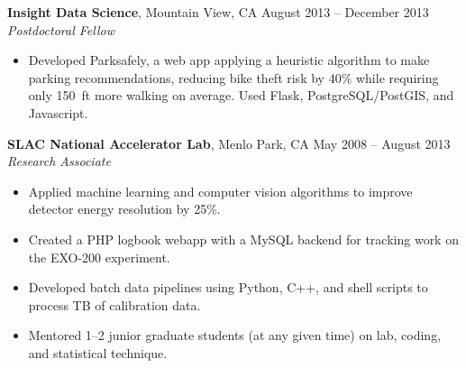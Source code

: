 \documentclass[margin,line]{resume}
\begin{document}
\begin{resume}
    \textbf{Insight Data Science}, Mountain View, CA \hfill August 2013 -- December 2013\vspace{1mm}\\\vspace{1mm}%
    \textsl{Postdoctoral Fellow}
    \begin{itemize}
    \item Developed Parksafely, a web app applying a heuristic algorithm to make parking recommendations, reducing bike theft risk by 40\% while requiring only 150~ft more walking on average. Used Flask, PostgreSQL/PostGIS, and Javascript.
    \end{itemize}

    \textbf{SLAC National Accelerator Lab}, Menlo Park, CA \hfill May 2008 -- August 2013\vspace{1mm}\\\vspace{1mm}%
    \textsl{Research Associate}
    \begin{itemize}
    \item Applied machine learning and computer vision algorithms to improve detector energy resolution by 25\%.
    \item Created a PHP logbook webapp with a MySQL backend for tracking work on the EXO-200 experiment.
    \item Developed batch data pipelines using Python, C++, and shell scripts to process TB of calibration data.
    \item Mentored 1--2 junior graduate students (at any given time) on lab, coding, and statistical technique.
    \end{itemize}
    
    

\end{resume}
\end{document}
